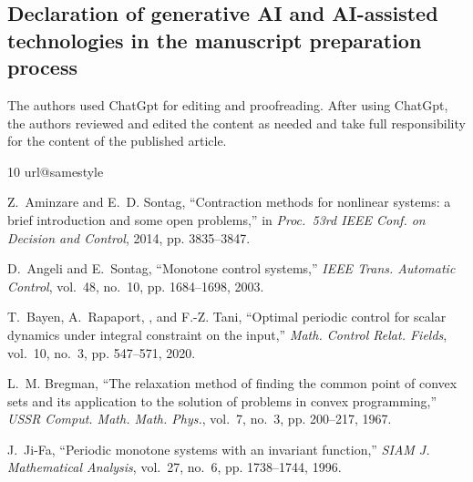 \documentclass[onecolumn]{IEEEtran}
\begin{document}
\subsection*{ Declaration of generative AI and AI-assisted technologies in the manuscript preparation process}
The authors used ChatGpt  for editing and proofreading. After using ChatGpt, the authors  reviewed and edited the content as needed and take full responsibility for the content of the published article.
\begin{thebibliography}{10}
\providecommand{\url}[1]{#1}
\csname url@samestyle\endcsname
\providecommand{\newblock}{\relax}
\providecommand{\bibinfo}[2]{#2}
\providecommand{\BIBentrySTDinterwordspacing}{\spaceskip=0pt\relax}
\providecommand{\BIBentryALTinterwordstretchfactor}{4}
\providecommand{\BIBentryALTinterwordspacing}{\spaceskip=\fontdimen2\font plus
\BIBentryALTinterwordstretchfactor\fontdimen3\font minus \fontdimen4\font\relax}
\providecommand{\BIBforeignlanguage}[2]{{%
\expandafter\ifx\csname l@#1\endcsname\relax
\typeout{** WARNING: IEEEtranS.bst: No hyphenation pattern has been}%
\typeout{** loaded for the language `#1'. Using the pattern for}%
\typeout{** the default language instead.}%
\else
\language=\csname l@#1\endcsname
\fi
#2}}
\providecommand{\BIBdecl}{\relax}
\BIBdecl

Z.~Aminzare and E.~D. Sontag, ``Contraction methods for nonlinear systems: a brief introduction and some open problems,'' in \emph{{Proc.\ 53rd IEEE Conf. on Decision and Control}}, 2014, pp. 3835--3847.

D.~Angeli and E.~Sontag, ``Monotone control systems,'' \emph{IEEE Trans. Automatic Control}, vol.~48, no.~10, pp. 1684--1698, 2003.

T.~Bayen, A.~Rapaport, , and F.-Z. Tani, ``Optimal periodic control for scalar dynamics under integral constraint on the input,'' \emph{Math. Control Relat. Fields}, vol.~10, no.~3, pp. 547--571, 2020.

L.~M. Bregman, ``The relaxation method of finding the common point of convex sets and its application to the solution of problems in convex programming,'' \emph{USSR Comput. Math. Math. Phys.}, vol.~7, no.~3, pp. 200--217, 1967.

J.~Ji-Fa, ``Periodic monotone systems with an invariant function,'' \emph{SIAM J. Mathematical Analysis}, vol.~27, no.~6, pp. 1738--1744, 1996.


\end{thebibliography}
\end{document}

